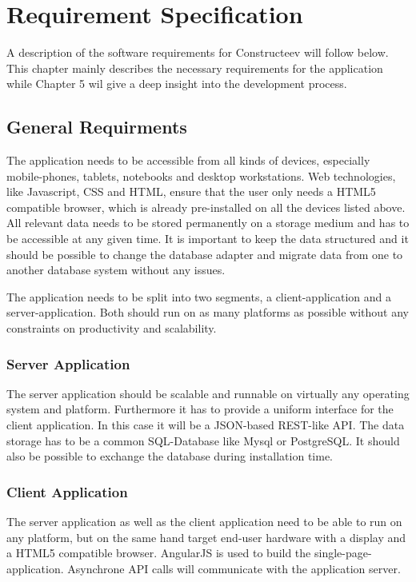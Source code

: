 \chapter{Requirement Specification}


A description of the software requirements for Constructeev will follow below. This chapter mainly describes the necessary requirements for the application while Chapter 5 wil give a deep insight into the development process.  
 
\section{General Requirments}
The application needs to be accessible from all kinds of devices, especially mobile-phones, tablets, notebooks and desktop workstations. Web technologies, like Javascript, CSS and HTML, ensure that the user only needs a HTML5 compatible browser, which is already pre-installed on all the devices listed above.
All relevant data needs to be stored permanently on a storage medium and has to be accessible at any given time. It is important to keep the data structured and it should be possible to change the database adapter and migrate data from one to another database system without any issues.

The application needs to be split into two segments, a client-application and a server-application. Both should run on as many platforms as possible without any constraints on productivity and scalability. 

\subsection{Server Application}
The server application should be scalable and runnable on virtually any operating system and platform. Furthermore it has to provide a uniform interface for the client application. In this case it will be a JSON-based REST-like API. The data storage has to be a common SQL-Database like Mysql or PostgreSQL. It should also be possible to exchange the database during installation time. 

\subsection{Client Application}
The server application as well as the client application need to be able to run on any platform, but on the same hand target end-user hardware with a display and a HTML5 compatible browser. AngularJS is used to build the single-page-application. Asynchrone API calls will communicate with the application server. 

